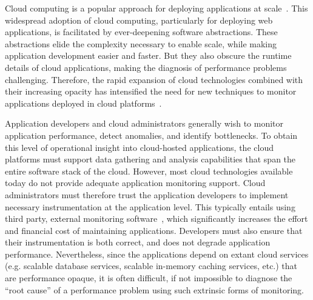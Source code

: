 Cloud computing is a popular approach for deploying
applications at scale~\cite{Antonopoulos:2010:CCP:1855007,Pinheiro:2014:ACC:2618168.2618188}. 
This widespread adoption of cloud computing, particularly for deploying
web applications, is facilitated by ever-deepening software abstractions.
These abstractions elide the complexity necessary to enable scale, while
making application development easier and faster.
But they also obscure the runtime details of cloud applications, 
making the diagnosis of performance problems challenging.
Therefore, the rapid expansion of cloud technologies
combined with their increasing opacity has intensified the need 
for new techniques to
monitor applications deployed in cloud platforms~\cite{DaCunhaRodrigues:2016:MCC:2851613.2851619}. 

Application developers and cloud administrators generally wish to monitor 
application performance, detect anomalies, and identify bottlenecks. To obtain 
this level of operational insight into cloud-hosted applications, the cloud platforms must support 
data gathering and analysis capabilities that span the entire software stack of the cloud. 
However, most cloud technologies available
today do not provide adequate application monitoring support. Cloud administrators must therefore trust the
application developers to implement necessary instrumentation 
at the application level. This typically entails using third party, external monitoring software~\cite{newrelic,dynatrace,datadog},
which significantly increases the effort and financial cost of maintaining applications.
Developers must also ensure
that their instrumentation is both correct, and does not degrade 
application performance.  Nevertheless, since the applications depend on extant
cloud services (e.g. scalable database services, 
scalable in-memory caching services, etc.) that are performance opaque, it is
often difficult, if not impossible to diagnose the ``root cause'' of a performance problem
using such extrinsic forms of monitoring.

